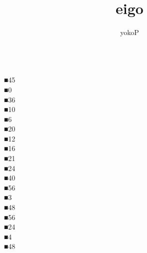 \documentclass[uplatex,
paper=a4,
fontsize=18pt,
jafontsize=16pt,
number_of_lines=30,
line_length=30zh,
baselineskip=25pt,
]{jlreq}
\author{yokoP}
\title{eigo}
\begin{document}
\begin{multicols}{3}
\\

■\hspace{1em}45
\\

■\hspace{1em}0
\\

■\hspace{1em}36
\\

■\hspace{1em}10
\\

■\hspace{1em}6
\\

■\hspace{1em}20
\\

■\hspace{1em}12
\\

■\hspace{1em}16
\\

■\hspace{1em}21
\\

■\hspace{1em}24
\\

■\hspace{1em}40
\\

■\hspace{1em}56
\\

■\hspace{1em}3
\\

■\hspace{1em}48
\\

■\hspace{1em}56
\\

■\hspace{1em}24
\\

■\hspace{1em}4
\\

■\hspace{1em}48
\\


\end{multicols}
\end{document}
